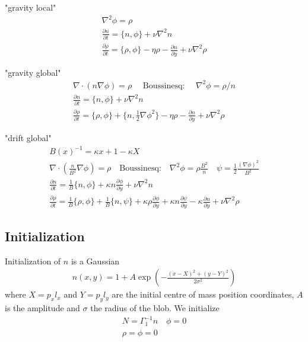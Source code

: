 \documentclass{hitec}
\begin{document}
"gravity local"
\begin{subequations}
\begin{align}
 \nabla^2 \phi = \rho \\
 \frac{\partial n}{\partial t} = \{ n, \phi\} + \nu \nabla^2 n  \\
  \frac{\partial \rho}{\partial t} = \{ \rho, \phi\} - \eta \rho - \frac{\partial n}{\partial y} + \nu \nabla^2 \rho 
\end{align}
\end{subequations}


"gravity global"
\begin{subequations}
\begin{align}
 \nabla \cdot(n \nabla \phi) = \rho \quad\text{ Boussinesq: }\quad \nabla^2 \phi = \rho/n \\
 \frac{\partial n}{\partial t} = \{ n, \phi\} +  \nu \nabla^2 n  \\
  \frac{\partial \rho}{\partial t} = \{ \rho, \phi\} + \{n, \frac{1}{2} \nabla\phi^2\} - \eta \rho - \frac{\partial n}{\partial y} +\nu\nabla^2\rho 
\end{align}
\end{subequations}

"drift global"
\begin{subequations}
\begin{align}
B(x)^{-1} = \kappa x +1-\kappa X\\
 \nabla \cdot \left(\frac{n}{B^2} \nabla \phi\right) = \rho \quad
 \text{Boussinesq:}\quad \nabla^2\phi = \rho \frac{B^2}{n} \quad
\psi = \frac{1}{2} \frac{(\nabla\phi)^2}{B^2}\\
 \frac{\partial n}{\partial t}     = 
    \frac{1}{B}\{ n, \phi\} 
  + \kappa n\frac{\partial \phi}{\partial y} 
  + \nu \nabla^2 n  \\
  \frac{\partial \rho}{\partial t} =
  \frac{1}{B}\{ \rho, \phi\} 
  + \frac{1}{B}\{n, \psi\}
  + \kappa \rho\frac{\partial \phi}{\partial y} 
  + \kappa n\frac{\partial \psi}{\partial y}
  - \kappa\frac{\partial n}{\partial y} +\nu\nabla^2\rho 
\end{align}
\end{subequations}


\subsection{Initialization}
Initialization of $n$ is a Gaussian 
\begin{align}
    n(x,y) = 1 + A\exp\left( -\frac{(x-X)^2 + (y-Y)^2}{2\sigma^2}\right)
    \label{}
\end{align}
where $X = p_x l_x$ and $Y=p_yl_y$ are the initial centre of mass position coordinates, $A$ is the amplitude and $\sigma$ the
radius of the blob.
We initialize 
\begin{align}
    N = \Gamma_1^{-1} n \quad \phi = 0 \\
    \rho = \phi = 0
    \label{}
\end{align}
\end{document}
